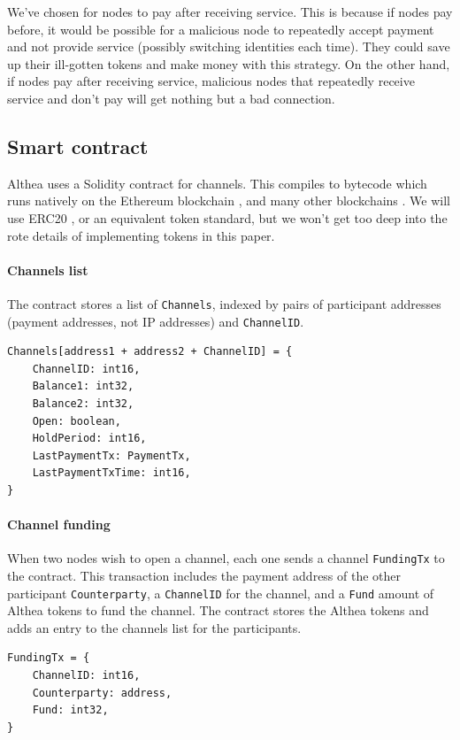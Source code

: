 \documentclass[11pt]{article}
\begin{document}
We’ve chosen for nodes to pay after receiving service. This is because if nodes pay before, it would be possible for a malicious node to repeatedly accept payment and not provide service (possibly switching identities each time). They could save up their ill-gotten tokens and make money with this strategy. On the other hand, if nodes pay after receiving service, malicious nodes that repeatedly receive service and don’t pay will get nothing but a bad connection.

\subsection{Smart contract}
Althea uses a Solidity contract for channels. This compiles to bytecode which runs natively on the Ethereum blockchain \cite{ethereum}, and many other blockchains \cite{ethermint}. We will use ERC20 \cite{erc20}, or an equivalent token standard, but we won’t get too deep into the rote details of implementing tokens in this paper.

\paragraph{Channels list}
The contract stores a list of \texttt{Channels}, indexed by pairs of participant addresses (payment addresses, not IP addresses) and \texttt{ChannelID}.

\begin{minipage}[c]{\textwidth}
\begin{lstlisting}
Channels[address1 + address2 + ChannelID] = {
	ChannelID: int16,
	Balance1: int32,
	Balance2: int32,
	Open: boolean,
	HoldPeriod: int16,
	LastPaymentTx: PaymentTx,
	LastPaymentTxTime: int16,
}
\end{lstlisting}
\end{minipage}

\paragraph{Channel funding}
When two nodes wish to open a channel, each one sends a channel \texttt{FundingTx} to the contract. This transaction includes the payment address of the other participant \texttt{Counterparty}, a \texttt{ChannelID} for the channel, and a \texttt{Fund} amount of Althea tokens to fund the channel. The contract stores the Althea tokens and adds an entry to the channels list for the participants.

\begin{minipage}[c]{\textwidth}
\begin{lstlisting}
FundingTx = {
	ChannelID: int16,
	Counterparty: address,
	Fund: int32,
}
\end{lstlisting}
\end{minipage}
\end{document}
